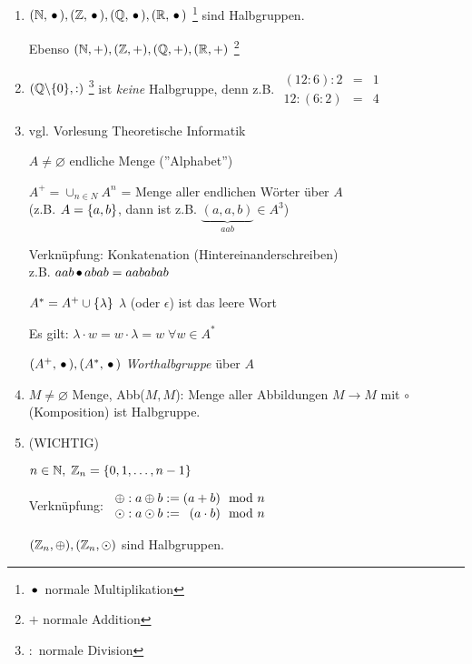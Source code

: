 \begin{enumerate}
	
	\item
	$(\mathbb{N}, \,{\bullet}\,), (\mathbb{Z}, \,{\bullet}\,), (\mathbb{Q}, \,{\bullet}\,), (\mathbb{R}, \,{\bullet}\,)$ \footnote{$\,{\bullet}\,$ normale Multiplikation}
	sind Halbgruppen.
	
	Ebenso $(\mathbb{N}, +), (\mathbb{Z}, +), (\mathbb{Q}, +), (\mathbb{R}, +)$ \footnote{$+$ normale Addition} 
	
	
	\item
	$(\mathbb{Q} \backslash \{0\}, :)$ \footnote{$:$ normale Division} ist \emph{keine} Halbgruppe, denn z.B.
	$\begin{array}{ccc}
	(12 : 6) : 2	&=& 1 \\
	12 : (6 : 2)	&=& 4
	\end{array}$
	
	\item
	vgl. Vorlesung Theoretische Informatik
	
	$A \neq \varnothing$ endliche Menge (''Alphabet'')
	
	$A^+ = \cup_{n \in N} A^n$ = Menge aller endlichen Wörter über $A$
	\\(z.B. $A=\left\{a, b\right\}$, dann ist z.B. $\underset{aab}{\underbrace{(a, a, b)}} \in A^3$)
	
	Verknüpfung: Konkatenation (Hintereinanderschreiben)
	\\z.B. $aab \,{\bullet}\, abab = aababab$
	
	$A^* = A^+ \cup \left\{\lambda\right\}$ 
	\quad$\lambda$ (oder $\epsilon$) ist das leere Wort 
	
	Es gilt: 
	$\lambda \cdot w = w \cdot \lambda = w \;\forall w \in A^*$
	
	$(A^+, \,{\bullet}\,), (A^*, \,{\bullet}\,)$ \emph{Worthalbgruppe} über $A$
	
	
	\item
	$M \neq \varnothing$ Menge, Abb($M,M$): Menge aller Abbildungen $M \to M$
	mit $\circ$ (Komposition) ist Halbgruppe.
	
	\item (WICHTIG)
	
	$n \in \mathbb{N},\; \mathbb{Z}_n = \left\{0, 1, \dots, n-1\right\}$
	
	Verknüpfung:
	$\begin{array}{c@{\;:\;}r@{\;:=\;}r}
		\oplus	& a \oplus b	& (a+b) \mod{n} \\
		\odot	& a \odot b		& (a\cdot b)\mod{n}
	\end{array}$
	
	$(\mathbb{Z}_n, \oplus), (\mathbb{Z}_n, \odot)$ sind Halbgruppen.
	
\end{enumerate}









